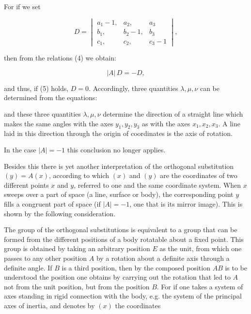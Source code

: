 For if we set

\[
D = \begin{vmatrix} a_1 - 1, & a_2, & a_3\\ b_1, & b_2 - 1, & b_3\\ c_1, & c_2, & c_3 - 1 \end{vmatrix},
\]

then from the relations (4) we obtain:

\[
|A|\, D = - D,
\]

and thus, if (5) holds, $D = 0$. Accordingly, three quantities
$\lambda, \mu, \nu$ can be determined from the equations:


and these three quantities $\lambda, \mu, \nu$ determine the direction of a straight line which makes the same
angles with the axes $y_1, y_2, y_3$ as with the axes $x_1, x_2, x_3$. A line laid in this
direction through the origin of coordinates is
the axis of rotation.

In the case $|A| = - 1$ this conclusion no longer applies.

Besides this there is yet another interpretation of the orthogonal
substitution $(y) = A (x)$, according to which $(x)$ and $(y)$ are the coordinates
of two different points $x$ and $y$, referred to one and
the same coordinate system. When $x$ sweeps over a part of space (a line,
surface or body), the corresponding
point $y$ fills a congruent part of space (if $|A| = - 1$, one
that is its mirror image). This is shown by the following consideration.

The group of the  orthogonal substitutions
is equivalent to a group that can be formed from the different
positions of a body rotatable about a fixed point.
This group is obtained by taking an arbitrary position $E$ as the unit, from which one passes to any other
position $A$ by a rotation about a definite axis through
a definite angle. If $B$ is a third position, then by
the composed position $AB$ is to be understood the position
one obtains by carrying out the rotation that led to $A$
not from the unit position, but from the
position $B$. For if one takes a system of axes standing in rigid
connection with the body, e.g. the system
of the principal axes of inertia, and denotes by $(x)$ the coordinates
